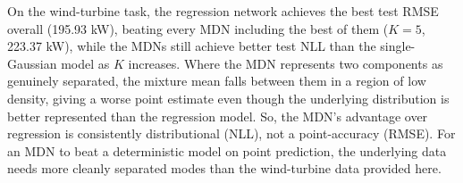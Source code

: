 \documentclass[10pt]{article}
\begin{document}
  On the wind-turbine task, the regression network achieves the best test RMSE overall (195.93 kW), beating every MDN including the best of them ($K=5$, 223.37 kW), while the MDNs still achieve better test NLL than the single-Gaussian model as $K$ increases.
  Where the MDN represents two components as genuinely separated, the mixture mean falls between them in a region of low density, giving a worse point estimate even though the underlying distribution is better represented than the regression model.
  So, the MDN's advantage over regression is consistently distributional (NLL), not a point-accuracy (RMSE).
  For an MDN to beat a deterministic model on point prediction, the underlying data needs more cleanly separated modes than the wind-turbine data provided here.
\end{document}
